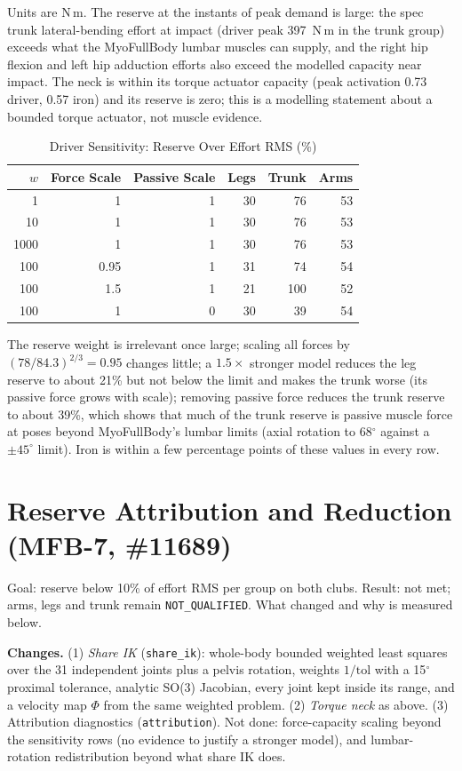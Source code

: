 \documentclass[11pt,a4paper]{article}
\begin{document}
\noindent Units are N\,m. The reserve at the instants of peak demand is large: the spec trunk lateral-bending effort at impact (driver peak 397~N\,m in the trunk group) exceeds what the MyoFullBody lumbar muscles can supply, and the right hip flexion and left hip adduction efforts also exceed the modelled capacity near impact. The neck is within its torque actuator capacity (peak activation 0.73 driver, 0.57 iron) and its reserve is zero; this is a modelling statement about a bounded torque actuator, not muscle evidence.

\begin{table}[h]\centering\small
\caption{Driver Sensitivity: Reserve Over Effort RMS (\%)}
\begin{tabular}{rrrrrr}\toprule $w$ & Force Scale & Passive Scale & Legs & Trunk & Arms \\\midrule
1 & 1 & 1 & 30 & 76 & 53 \\
10 & 1 & 1 & 30 & 76 & 53 \\
1000 & 1 & 1 & 30 & 76 & 53 \\
100 & 0.95 & 1 & 31 & 74 & 54 \\
100 & 1.5 & 1 & 21 & 100 & 52 \\
100 & 1 & 0 & 30 & 39 & 54 \\
\bottomrule\end{tabular}\end{table}
\noindent The reserve weight is irrelevant once large; scaling all forces by $(78/84.3)^{2/3}=0.95$ changes little; a $1.5\times$ stronger model reduces the leg reserve to about 21\% but not below the limit and makes the trunk worse (its passive force grows with scale); removing passive force reduces the trunk reserve to about 39\%, which shows that much of the trunk reserve is passive muscle force at poses beyond MyoFullBody's lumbar limits (axial rotation to 68$^\circ$ against a $\pm45^\circ$ limit). Iron is within a few percentage points of these values in every row.

\section{Reserve Attribution and Reduction (MFB-7, \#11689)}
Goal: reserve below 10\% of effort RMS per group on both clubs. Result: not met; arms, legs and trunk remain \texttt{NOT\_QUALIFIED}. What changed and why is measured below.

\textbf{Changes.} (1) \emph{Share IK} (\texttt{share\_ik}): whole-body bounded weighted least squares over the 31 independent joints plus a pelvis rotation, weights $1/\mathrm{tol}$ with a 15$^\circ$ proximal tolerance, analytic SO(3) Jacobian, every joint kept inside its range, and a velocity map $\Phi$ from the same weighted problem. (2) \emph{Torque neck} as above. (3) Attribution diagnostics (\texttt{attribution}). Not done: force-capacity scaling beyond the sensitivity rows (no evidence to justify a stronger model), and lumbar-rotation redistribution beyond what share IK does.
\end{document}
